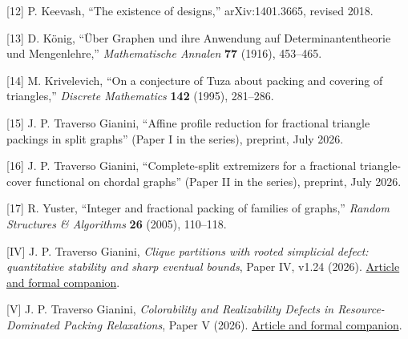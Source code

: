 \documentclass[english,11pt,a4paper]{article}
\begin{document}
{[}12{]} P. Keevash, ``The existence of designs,'' arXiv:1401.3665,
revised 2018.

{[}13{]} D. König, ``Über Graphen und ihre Anwendung auf
Determinantentheorie und Mengenlehre,'' \emph{Mathematische Annalen}
\textbf{77} (1916), 453--465.

{[}14{]} M. Krivelevich, ``On a conjecture of Tuza about packing and
covering of triangles,'' \emph{Discrete Mathematics} \textbf{142}
(1995), 281--286.

{[}15{]} J. P. Traverso Gianini, ``Affine profile reduction for
fractional triangle packings in split graphs'' (Paper I in the series),
preprint, July 2026.

{[}16{]} J. P. Traverso Gianini, ``Complete-split extremizers for a
fractional triangle-cover functional on chordal graphs'' (Paper II in
the series), preprint, July 2026.

{[}17{]} R. Yuster, ``Integer and fractional packing of families of
graphs,'' \emph{Random Structures \& Algorithms} \textbf{26} (2005),
110--118.

{[}IV{]} J. P. Traverso Gianini, \emph{Clique partitions with rooted
simplicial defect: quantitative stability and sharp eventual bounds},
Paper IV, v1.24 (2026).
\href{https://github.com/jtraverso/erdos-81-chordal-clique-partitions/tree/eb335845bfa23375d5040ea31fc4f4b366346287/preprints/PAPER_IV}{Article
and formal companion}.

{[}V{]} J. P. Traverso Gianini, \emph{Colorability and Realizability
Defects in Resource-Dominated Packing Relaxations}, Paper V (2026).
\href{https://github.com/jtraverso/erdos-81-chordal-clique-partitions/tree/eb335845bfa23375d5040ea31fc4f4b366346287/preprints/PAPER_V}{Article
and formal companion}.
\end{document}
